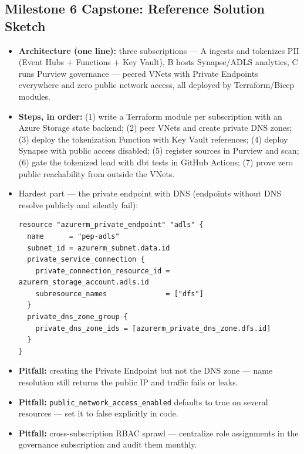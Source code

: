 \documentclass[11pt, a4paper]{article}
\begin{document}
\subsection*{Milestone 6 Capstone: Reference Solution Sketch}
\begin{itemize}[label=-, itemsep=1pt]
    \item \textbf{Architecture (one line):} three subscriptions --- A ingests and tokenizes PII (Event Hubs + Functions + Key Vault), B hosts Synapse/ADLS analytics, C runs Purview governance --- peered VNets with Private Endpoints everywhere and zero public network access, all deployed by Terraform/Bicep modules.
    \item \textbf{Steps, in order:} (1) write a Terraform module per subscription with an Azure Storage state backend; (2) peer VNets and create private DNS zones; (3) deploy the tokenization Function with Key Vault references; (4) deploy Synapse with public access disabled; (5) register sources in Purview and scan; (6) gate the tokenized load with dbt tests in GitHub Actions; (7) prove zero public reachability from outside the VNets.
    \item Hardest part --- the private endpoint with DNS (endpoints without DNS resolve publicly and silently fail):
\begin{lstlisting}[language={}]
resource "azurerm_private_endpoint" "adls" {
  name      = "pep-adls"
  subnet_id = azurerm_subnet.data.id
  private_service_connection {
    private_connection_resource_id = azurerm_storage_account.adls.id
    subresource_names              = ["dfs"]
  }
  private_dns_zone_group {
    private_dns_zone_ids = [azurerm_private_dns_zone.dfs.id]
  }
}
\end{lstlisting}
    \item \textbf{Pitfall:} creating the Private Endpoint but not the DNS zone --- name resolution still returns the public IP and traffic fails or leaks.
    \item \textbf{Pitfall:} \texttt{public\_network\_access\_enabled} defaults to true on several resources --- set it to false explicitly in code.
    \item \textbf{Pitfall:} cross-subscription RBAC sprawl --- centralize role assignments in the governance subscription and audit them monthly.
\end{itemize}
\end{document}
